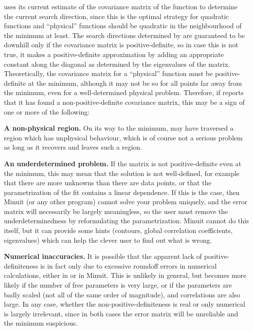  uses its current estimate of the covariance matrix of the
function to determine the current search direction, since this is
the optimal strategy for quadratic functions and ``physical'' functions
should be quadratic in the neighbourhood of the minimum at least.
The search directions determined by  are guaranteed to be
downhill only if the covariance matrix is positive-definite,
so in case this is not true, it makes a positive-definite
approximation by adding an appropriate constant along the diagonal
as determined by the eigenvalues of the matrix.
Theoretically, the covariance matrix for a ``physical'' function must be
positive-definite at the minimum, although it may not be so
for all points far away from the minimum, even for a well-determined
physical problem. 
Therefore, if  reports that it has found a
non-positive-definite covariance matrix, this may be
a sign of one or more of the following:

\begin{UL}
\item {\bf A non-physical region.}
      On its way to the minimum, 
      may have traversed a region which has
      unphysical behaviour, which is of course not a serious problem as long
      as it recovers and leaves such a region.
\item {\bf An underdetermined problem.}
      If the matrix is not positive-definite even at the minimum,
      this may mean that the solution is not well-defined, for example
      that there are more unknowns than there are data points, or that the
      parametrization of the fit contains a linear dependence.
      If this is the case, then Minuit (or any other program) cannot solve
      your problem uniquely, and the error matrix will necessarily be
      largely meaningless, so the user must remove the underdeterminedness
      by reformulating the parametrization. Minuit cannot do this itself,
      but it can provide some hints (contours, global correlation coefficients,
      eigenvalues) which can help the clever user to find out what is wrong.
\item {\bf Numerical inaccuracies.}
      It is possible that the apparent lack of positive-definiteness
      is in fact only due to excessive roundoff errors in numerical
      calculations, either in  or in Minuit.
      This is unlikely in general, but becomes more likely if the number of
      free parameters is very large, or if the parameters are badly scaled
      (not all of the same order of magnitude), and correlations are
      also large.
      In any  case, whether the non-positive-definiteness is
      real or only numerical is largely irrelevant, since in both cases the
      error matrix will be unreliable and the minimum suspicious.
\end{UL}

